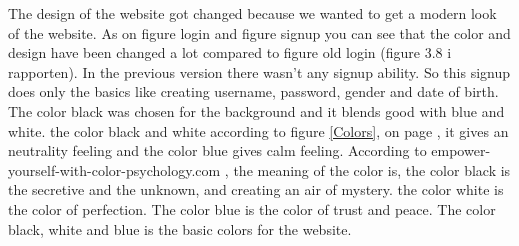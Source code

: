 The design of the website got changed because we wanted to get a modern look of the website. As on figure login and figure signup you can see that the color and design have been changed a lot compared to figure old login (figure 3.8 i rapporten). In the previous version there wasn’t any signup ability. So this signup does only the basics like creating username, password, gender and date of birth. The color black was chosen for the background and it blends good with blue and white. the color black and white according to figure \ref{Colors}, on page \pageref{Colors}, it gives an neutrality feeling and the color blue gives calm feeling. According to empower-yourself-with-color-psychology.com \cite{EmpowerColor}, the meaning of the color is,  the color black is the secretive and the unknown, and creating an air of mystery. the color white is the color of perfection. The color blue is the color of trust and peace. The color black, white and blue is the basic colors for the website.



